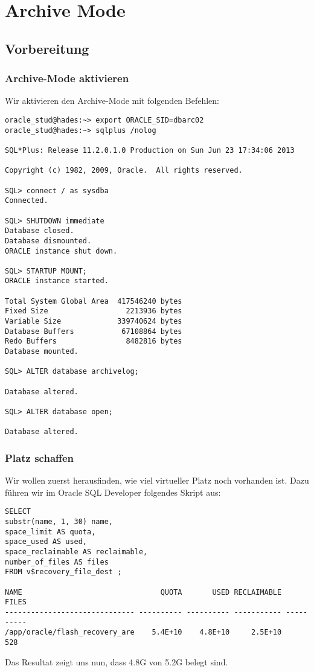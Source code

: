 \documentclass[11pt,a4paper,parskip=half]{scrartcl}
\begin{document}
\newpage
\section{Archive Mode}
\subsection{Vorbereitung}
\subsubsection{Archive-Mode aktivieren}
Wir aktivieren den Archive-Mode mit folgenden Befehlen:
\begin{lstlisting}
oracle_stud@hades:~> export ORACLE_SID=dbarc02
oracle_stud@hades:~> sqlplus /nolog

SQL*Plus: Release 11.2.0.1.0 Production on Sun Jun 23 17:34:06 2013

Copyright (c) 1982, 2009, Oracle.  All rights reserved.

SQL> connect / as sysdba
Connected.

SQL> SHUTDOWN immediate
Database closed.
Database dismounted.
ORACLE instance shut down.

SQL> STARTUP MOUNT;
ORACLE instance started.

Total System Global Area  417546240 bytes
Fixed Size                  2213936 bytes
Variable Size             339740624 bytes
Database Buffers           67108864 bytes
Redo Buffers                8482816 bytes
Database mounted.

SQL> ALTER database archivelog;

Database altered.

SQL> ALTER database open;

Database altered.
\end{lstlisting}
\subsubsection{Platz schaffen}
Wir wollen zuerst herausfinden, wie viel virtueller Platz noch vorhanden ist. Dazu führen wir im Oracle SQL Developer folgendes Skript aus:
\begin{lstlisting}
SELECT
substr(name, 1, 30) name,
space_limit AS quota,
space_used AS used,
space_reclaimable AS reclaimable,
number_of_files AS files
FROM v$recovery_file_dest ;

NAME                                QUOTA       USED RECLAIMABLE      FILES
------------------------------ ---------- ---------- ----------- ----------
/app/oracle/flash_recovery_are    5.4E+10    4.8E+10     2.5E+10        528 
\end{lstlisting}
Das Resultat zeigt uns nun, dass 4.8G von 5.2G belegt sind.
\end{document}
